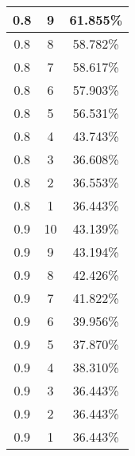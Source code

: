 \begin{center}
\begin{longtable}{|c|c|c|}
\hline
0.8 & 9 & 61.855\% \\
\hline
0.8 & 8 & 58.782\% \\
\hline
0.8 & 7 & 58.617\% \\
\hline
0.8 & 6 & 57.903\% \\
\hline
0.8 & 5 & 56.531\% \\
\hline
0.8 & 4 & 43.743\% \\
\hline
0.8 & 3 & 36.608\% \\
\hline
0.8 & 2 & 36.553\% \\
\hline
0.8 & 1 & 36.443\% \\
\hline
\hline
0.9 & 10 & 43.139\% \\
\hline
0.9 & 9 & 43.194\% \\
\hline
0.9 & 8 & 42.426\% \\
\hline
0.9 & 7 & 41.822\% \\
\hline
0.9 & 6 & 39.956\% \\
\hline
0.9 & 5 & 37.870\% \\
\hline
0.9 & 4 & 38.310\% \\
\hline
0.9 & 3 & 36.443\% \\
\hline
0.9 & 2 & 36.443\% \\
\hline
0.9 & 1 & 36.443\% \\
\hline
\hline
\end{longtable}
\end{center}
